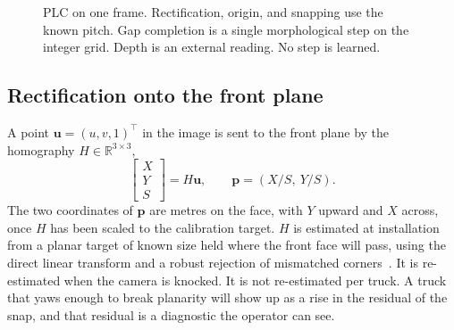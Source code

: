 \begin{figure}[t]
\centering
{}
\caption{PLC on one frame. Rectification, origin, and snapping use the known pitch. Gap completion is a single morphological step on the integer grid. Depth is an external reading. No step is learned.}
\label{fig:plc-block}
\end{figure}

\subsection{Rectification onto the front plane}
\label{sec:plc-homography}

A point $\mathbf{u}=(u,v,1)^{\top}$ in the image is sent to the front plane by the homography $H\in\mathbb{R}^{3\times 3}$,
\begin{equation}
\begin{bmatrix} X \\ Y \\ S \end{bmatrix}
= H \mathbf{u},
\qquad
\mathbf{p} = (X/S,\ Y/S).
\label{eq:homography}
\end{equation}
The two coordinates of $\mathbf{p}$ are metres on the face, with $Y$ upward and $X$ across, once $H$ has been scaled to the calibration target. $H$ is estimated at installation from a planar target of known size held where the front face will pass, using the direct linear transform and a robust rejection of mismatched corners~\cite{hartley2004mvg,fischler1981ransac,zhang2000calibration}. It is re-estimated when the camera is knocked. It is not re-estimated per truck. A truck that yaws enough to break planarity will show up as a rise in the residual of the snap, and that residual is a diagnostic the operator can see.

